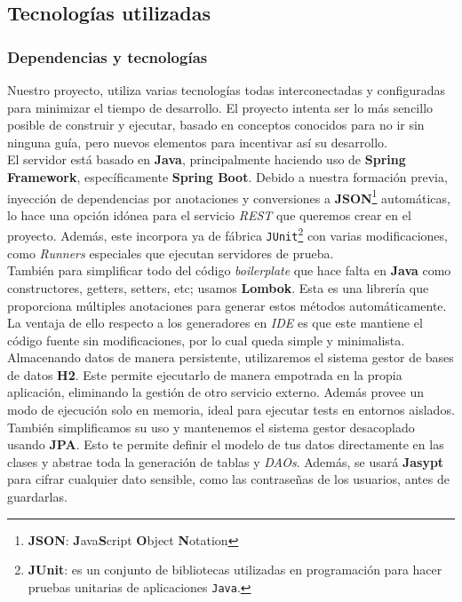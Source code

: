 \documentclass[../ei103948-project-documentation.tex]{subfiles}
\begin{document}
    \subsection{Tecnologías utilizadas}
				\subsubsection{Dependencias y tecnologías}

				Nuestro proyecto, utiliza varias tecnologías todas interconectadas y configuradas para minimizar el tiempo de desarrollo. El proyecto intenta ser lo más sencillo posible de construir y ejecutar, basado en conceptos conocidos para no ir sin ninguna guía, pero nuevos elementos para incentivar así su desarrollo.\\

				El servidor está basado en \textbf{Java}, principalmente haciendo uso de \textbf{Spring Framework}, específicamente \textbf{Spring Boot}. Debido a nuestra formación previa, inyección de dependencias por anotaciones y conversiones a \textbf{JSON}\footnote{\textbf{JSON}: \textbf{J}ava\textbf{S}cript \textbf{O}bject \textbf{N}otation} automáticas, lo hace una opción idónea para el servicio \textit{REST} que queremos crear en el proyecto. Además, este incorpora ya de fábrica \texttt{JUnit}\footnote{\textbf{JUnit}: es un conjunto de bibliotecas utilizadas en programación para hacer pruebas unitarias de aplicaciones \texttt{Java}.} con varias modificaciones, como \textit{Runners} especiales que ejecutan servidores de prueba.\\

				También para simplificar todo del código \textit{boilerplate} que hace falta en \textbf{Java} como constructores, getters, setters, etc; usamos \textbf{Lombok}. Esta es una librería que proporciona múltiples anotaciones para generar estos métodos automáticamente. La ventaja de ello respecto a los generadores en \textit{IDE} es que este mantiene el código fuente sin modificaciones, por lo cual queda simple y minimalista.\\

				Almacenando datos de manera persistente, utilizaremos el sistema gestor de bases de datos \textbf{H2}. Este permite ejecutarlo de manera empotrada en la propia aplicación, eliminando la gestión de otro servicio externo. Además provee un modo de ejecución solo en memoria, ideal para ejecutar tests en entornos aislados. También simplificamos su uso y mantenemos el sistema gestor desacoplado usando \textbf{JPA}. Esto te permite definir el modelo de tus datos directamente en las clases y abstrae toda la generación de tablas y \textit{DAOs}. Además, se usará \textbf{Jasypt} para cifrar cualquier dato sensible, como las contraseñas de los usuarios, antes de guardarlas.\\
\end{document}
